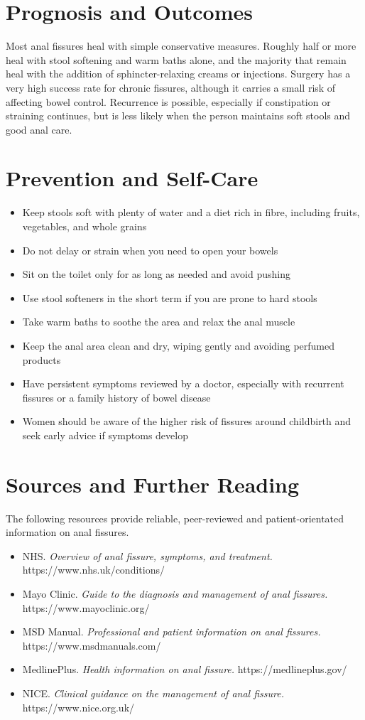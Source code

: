 \section*{Prognosis and Outcomes}
Most anal fissures heal with simple conservative measures. Roughly half or more heal with stool softening and warm baths alone, and the majority that remain heal with the addition of sphincter-relaxing creams or injections. Surgery has a very high success rate for chronic fissures, although it carries a small risk of affecting bowel control. Recurrence is possible, especially if constipation or straining continues, but is less likely when the person maintains soft stools and good anal care.

\section*{Prevention and Self-Care}
\begin{itemize}
    \item Keep stools soft with plenty of water and a diet rich in fibre, including fruits, vegetables, and whole grains
    \item Do not delay or strain when you need to open your bowels
    \item Sit on the toilet only for as long as needed and avoid pushing
    \item Use stool softeners in the short term if you are prone to hard stools
    \item Take warm baths to soothe the area and relax the anal muscle
    \item Keep the anal area clean and dry, wiping gently and avoiding perfumed products
    \item Have persistent symptoms reviewed by a doctor, especially with recurrent fissures or a family history of bowel disease
    \item Women should be aware of the higher risk of fissures around childbirth and seek early advice if symptoms develop
\end{itemize}

\section*{Sources and Further Reading}
The following resources provide reliable, peer-reviewed and patient-orientated information on anal fissures.

\begin{itemize}
    \item NHS. \textit{Overview of anal fissure, symptoms, and treatment.} https://www.nhs.uk/conditions/
    \item Mayo Clinic. \textit{Guide to the diagnosis and management of anal fissures.} https://www.mayoclinic.org/
    \item MSD Manual. \textit{Professional and patient information on anal fissures.} https://www.msdmanuals.com/
    \item MedlinePlus. \textit{Health information on anal fissure.} https://medlineplus.gov/
    \item NICE. \textit{Clinical guidance on the management of anal fissure.} https://www.nice.org.uk/
\end{itemize}
